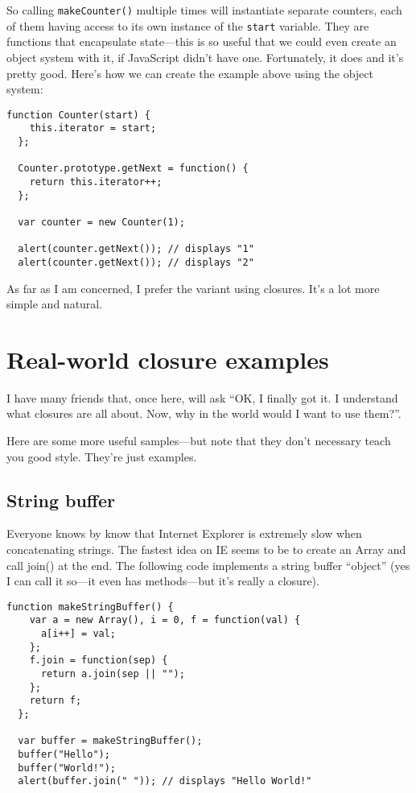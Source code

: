 So calling \lstinline{makeCounter()} multiple times will instantiate separate
counters, each of them having access to its own instance of the
\lstinline{start} variable.  They are functions that encapsulate state—this is
so useful that we could even create an object system with it, if JavaScript
didn't have one.  Fortunately, it does and it's pretty good.  Here's how we can
create the example above using the object system:

\begin{lstlisting}[nolol]
  function Counter(start) {
    this.iterator = start;
  };

  Counter.prototype.getNext = function() {
    return this.iterator++;
  };

  var counter = new Counter(1);

  alert(counter.getNext()); // displays "1"
  alert(counter.getNext()); // displays "2"
\end{lstlisting}

As far as I am concerned, I prefer the variant using closures.  It's a lot more
simple and natural.

\section{Real-world closure examples}

I have many friends that, once here, will ask “OK, I finally got it.  I
understand what closures are all about.  Now, why in the world would I want to
use them?”.

Here are some more useful samples—but note that they don't necessary teach you
good style.  They're just examples.

\subsection{String buffer}

Everyone knows by know that Internet Explorer is extremely slow when
concatenating strings.  The fastest idea on IE seems to be to create an Array
and call join() at the end.  The following code implements a string buffer
“object” (yes I can call it so—it even has methods—but it's really a closure).

\begin{lstlisting}[nolol]
  function makeStringBuffer() {
    var a = new Array(), i = 0, f = function(val) {
      a[i++] = val;
    };
    f.join = function(sep) {
      return a.join(sep || "");
    };
    return f;
  };

  var buffer = makeStringBuffer();
  buffer("Hello");
  buffer("World!");
  alert(buffer.join(" ")); // displays "Hello World!"
\end{lstlisting}

